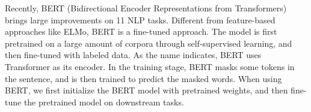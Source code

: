 \documentclass[conference]{IEEEtran}
\begin{document}
Recently, BERT (Bidirectional Encoder Representations from Transformers) brings large improvements on 
11 NLP tasks.
Different from feature-based approaches like ELMo, BERT is a fine-tuned approach.
The model is first pretrained on a large amount of corpora through self-supervised learning,
and then fine-tuned with labeled data. 
As the name indicates, BERT uses Transformer as its encoder.
In the training stage, BERT masks some tokens in the sentence, and is then trained  to predict the masked words.
When using BERT, we first initialize the BERT model with pretrained weights, and then fine-tune 
the pretrained model on downstream tasks.



\end{document}
